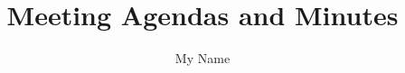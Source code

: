 \documentclass[9pt]{article}
\begin{document}
\thispagestyle{empty}

\title{Meeting Agendas and Minutes}
\author{My Name}
\maketitle
\medskip

\tableofcontents
\thispagestyle{empty}

\clearpage

\end{document}
